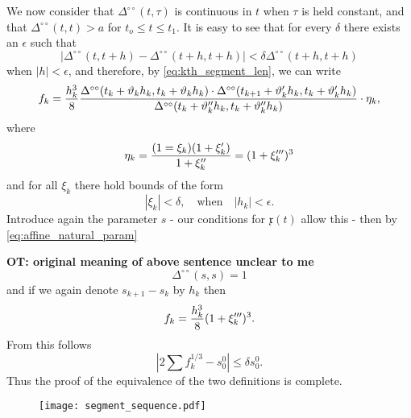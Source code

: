 \documentclass[11pt]{book} \usepackage{amssymb}
\newcommand{\myvec}[1]{\mathfrak{#1}}
\begin{document}
We now consider that $\Delta^{\circ\circ}(t,\tau)$ is continuous in $t$ when
$\tau$ is held constant, and that $\Delta^{\circ\circ}(t,t) > a$ for 
$t_o\leq t\leq t_1$. It is easy to see that for every $\delta$ there exists
an $\epsilon$ such that
\begin{equation}
  \label{eq:delta_bound}
  |\Delta^{\circ\circ}(t,t+h)-\Delta^{\circ\circ}(t+h,t+h)|
  < \delta\Delta^{\circ\circ}(t+h,t+h)
\end{equation}
when $|h|<\epsilon$, and therefore, by \eqref{eq:kth_segment_len}, we can write
\begin{equation}
  \label{eq:kth_segment_len2}
  f_k={h_k^3\over 8}
  {\Delta^{\circ\circ}(t_k+\vartheta_kh_k, t_k+\vartheta_kh_k)
    \cdot \Delta^{\circ\circ}(t_{k+1}+\vartheta'_kh_k, t_k+\vartheta'_kh_k)
    \over 
    \Delta^{\circ\circ}(t_k+\vartheta''_kh_k, t_k+\vartheta''_kh_k)
  }\cdot \eta_k,
\end{equation}
where 
\begin{equation}
  \label{eq:eta_k_def}
  \eta_k={(1=\xi_k)(1+\xi'_k)\over 1+\xi''_k}=(1+\xi'''_k)^3
\end{equation}
and for all $\xi_k$ there hold bounds of the form
\begin{equation}
  \label{eq:xi_bounds}
  |\xi_k|<\delta, \quad \mathrm{when} \quad |h_k|<\epsilon.
\end{equation}
Introduce again the parameter $s$ - our conditions for $\myvec{x}(t)$ allow this
- then by \eqref{eq:affine_natural_param}

{\bf OT: original meaning of above sentence unclear to me}
\begin{equation}
  \Delta^{\circ\circ}(s,s)=1
\end{equation}
and if we again denote $s_{k+1}-s_k$ by $h_k$ then 
\begin{equation}
  \label{eq:f_k_by_h_k}
  f_k={h_k^3\over 8}(1+\xi_k''')^3.
\end{equation}
From this follows
\begin{equation}
  \left|2\sum f_k^{1/3}-s_0^0\right|\leq \delta s_0^0.
\end{equation}
Thus the proof of the equivalence of the two definitions is complete.

\begin{figure}[htp]
  \centering
  \texttt{[image: segment\_sequence.pdf]}
  \caption{}
  \label{fig:segment_sequence}
\end{figure}
\end{document}
